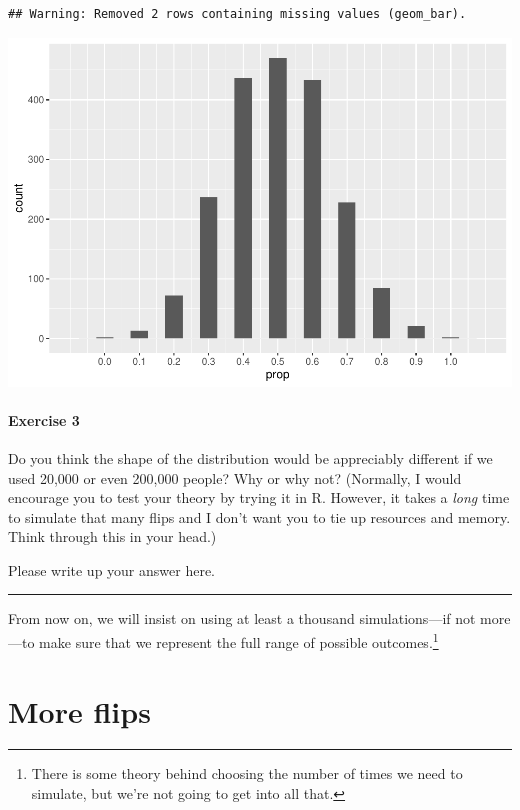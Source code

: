 \documentclass[
]{book}
\begin{document}
\begin{verbatim}
## Warning: Removed 2 rows containing missing values (geom_bar).
\end{verbatim}

\includegraphics{intro_stats_files/figure-latex/unnamed-chunk-221-1.pdf}

\hypertarget{exercise-3-4}{%
\paragraph*{Exercise 3}\label{exercise-3-4}}

Do you think the shape of the distribution would be appreciably different if we used 20,000 or even 200,000 people? Why or why not? (Normally, I would encourage you to test your theory by trying it in R. However, it takes a \emph{long} time to simulate that many flips and I don't want you to tie up resources and memory. Think through this in your head.)

Please write up your answer here.

\begin{center}\rule{0.5\linewidth}{0.5pt}\end{center}

From now on, we will insist on using at least a thousand simulations---if not more---to make sure that we represent the full range of possible outcomes.\footnote{There is some theory behind choosing the number of times we need to simulate, but we're not going to get into all that.}

\hypertarget{randomization1-more}{%
\section{More flips}\label{randomization1-more}}
\end{document}
